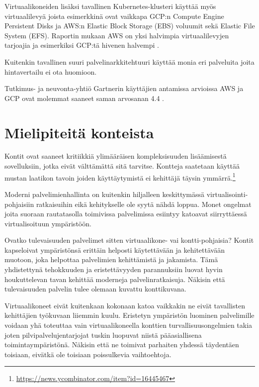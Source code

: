 \documentclass[finnish,gradu]{tktltiki3}
\begin{document}
    Virtuaalikoneiden lisäksi tavallinen Kubernetes-klusteri käyttää myös virtuaalilevyä joista esimerkkinä ovat vaikkapa GCP:n Compute Engine Persistent Disks ja AWS:n Elastic Block Storage (EBS) voluumit sekä Elastic File System (EFS). Raportin mukaan AWS on yksi halvimpia virtuaalilevyjen tarjoajia ja esimerkiksi GCP:tä hivenen halvempi \cite{cloud-price-comparison}.
    
    Kuitenkin tavallinen suuri palvelinarkkitehtuuri käyttää monia eri palveluita joita hintavertailu ei ota huomioon.
    
    Tutkimus- ja neuvonta-yhtiö Gartnerin käyttäjien antamissa arvioissa AWS ja GCP ovat molemmat saaneet saman arvosanan 4.4 \cite{gartner-aws-gcp}.
    
    \section{Mielipiteitä konteista}
    
    Kontit ovat saaneet kritiikkiä ylimääräisen kompleksisuuden lisäämisestä sovelluksiin, jotka eivät välttämättä sitä tarvitse. Kontteja saatetaan käyttää mustan laatikon tavoin joiden käyttäytymistä ei kehittäjä täysin ymmärrä.\footnote{\url{https://news.ycombinator.com/item?id=16445467}}
    
    Moderni palvelimienhallinta on kuitenkin hiljalleen keskittymässä virtualisointi-pohjaisiin ratkaisuihin eikä kehitykselle ole syytä nähdä loppua. Monet ongelmat joita suoraan rautatasolla toimivissa palvelimissa esiintyy katoavat siirryttäessä virtualisoituun ympäristöön. 
    
    Ovatko tulevaisuuden palvelimet sitten virtuaalikone- vai kontti-pohjaisia? Kontit kapseloivat ympäristönsä erittäin helposti käytettävään ja kehitettävään muotoon, joka helpottaa palvelimien kehittämistä ja jakamista. Tämä yhdistettynä tehokkuuden ja eristettävyyden parannuksiin luovat hyvin houkuttelevan tavan kehittää moderneja palvelinratkaisuja. Näkisin että tulevaisuuden palvelin tulee olemaan kuvattu konttikuvana.
    
    Virtuaalikoneet eivät kuitenkaan kokonaan katoa vaikkakin ne eivät tavallisten kehittäjien työkuvaan liiemmin kuulu. Eristetyn ympäristön luominen palvelimille voidaan yhä toteuttaa vain virtuaalikoneella konttien turvallisuusongelmien takia joten pilvipalvelujentarjojat tuskin luopuvat niistä pääasiallisena toimintaympäristönä. Näkisin että ne toimivat parhaiten yhdessä täydentäen toisiaan, eivätkä ole toisiaan poissulkevia vaihtoehtoja.
    
\end{document}
